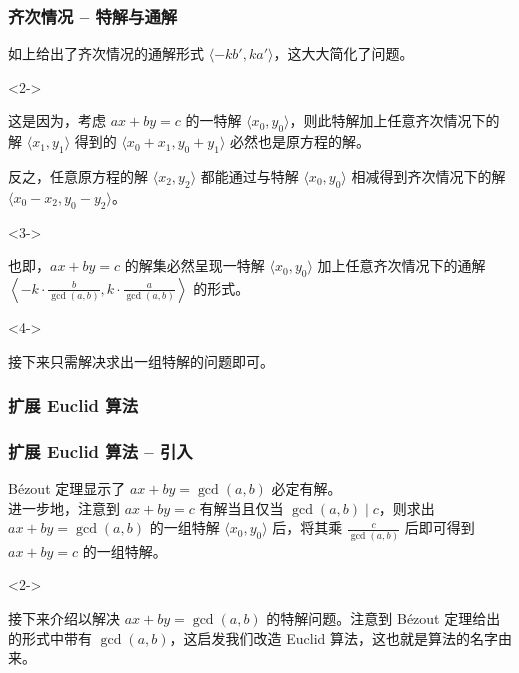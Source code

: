 \documentclass{../pkslide}
\begin{document}
\begin{frame}
  \frametitle{齐次情况 -- 特解与通解}
  如上给出了齐次情况的通解形式 $\langle -k b', k a' \rangle$，这大大简化了问题。
  
  \begin{uncoverenv}<2->
    \emptyline
    
    这是因为，考虑 $a x + b y = c$ 的一特解 $\langle x_0, y_0 \rangle$，则此特解加上任意齐次情况下的解 $\langle x_1, y_1 \rangle$ 得到的 $\langle x_0 + x_1, y_0 + y_1 \rangle$ 必然也是原方程的解。
    
    反之，任意原方程的解 $\langle x_2, y_2 \rangle$ 都能通过与特解 $\langle x_0, y_0 \rangle$ 相减得到齐次情况下的解 $\langle x_0 - x_2, y_0 - y_2 \rangle$。
  \end{uncoverenv}
  
  \begin{uncoverenv}<3->
    \emptyline
    
    也即，$a x + b y = c$ 的解集必然呈现一特解 $\langle x_0, y_0 \rangle$ 加上任意齐次情况下的通解 $\left\langle -k \cdot \frac{b}{\gcd(a, b)}, k \cdot \frac{a}{\gcd(a, b)} \right\rangle$ 的形式。
  \end{uncoverenv}
  
  \begin{uncoverenv}<4->
    \emptyline
    
    接下来只需解决求出一组特解的问题即可。
  \end{uncoverenv}
\end{frame}


\subsubsection{扩展 Euclid 算法}


\begin{frame}
  \frametitle{扩展 Euclid 算法 -- 引入}
  Bézout 定理显示了 $a x + b y = \gcd(a, b)$ 必定有解。\\
  进一步地，注意到 $a x + b y = c$ 有解当且仅当 $\gcd(a, b) \mid c$，则求出 $a x + b y = \gcd(a, b)$ 的一组特解 $\langle x_0, y_0 \rangle$ 后，将其乘 $\frac{c}{\gcd(a, b)}$ 后即可得到 $a x + b y = c$ 的一组特解。
  
  \begin{uncoverenv}<2->
    \emptyline
    
    接下来介绍以解决 $a x + b y = \gcd(a, b)$ 的特解问题。注意到 Bézout 定理给出的形式中带有 $\gcd(a, b)$，这启发我们改造 Euclid 算法，这也就是算法的名字由来。
  \end{uncoverenv}
\end{frame}
\end{document}
